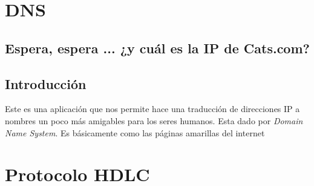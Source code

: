 \documentclass[12pt, fleqn]{report}                             %
\theoremstyle{break}                                            %
\begin{document}
    \chapter{DNS}
    \section*{Espera, espera ... ¿y cuál es la IP de Cats.com?}


        \clearpage
        \section{Introducción}

            Este es una aplicación que nos permite hace una traducción de direcciones IP a
            nombres un poco más amigables para los seres humanos.
            Esta dado por \emph{Domain Name System}. Es básicamente como las páginas
            amarillas del internet




    \chapter{Protocolo HDLC}
\end{document}
